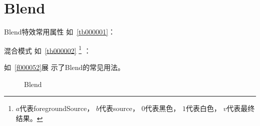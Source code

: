 ﻿




\FloatBarrier
\section{
Blend
}\label{c000015s000002}


Blend特效常用属性
如\tablename\ \ref{tb000001}：



混合模式
如\tablename\ \ref{tb000002}
    \footnote{$a$代表foregroundSource，
$b$代表source，
$0$代表黑色，
$1$代表白色，
$v$代表最终结果。}
：



如\filesourcenumbernameone\ \ref{f000052}展
示了Blend的常见用法。

\begin{figure}[htb] %
\marginnote{\setlength\fboxsep{2pt}\fbox{\footnotesize{\kaishu\figurename\,}\footnotesize{\ref{p000018}}}}\centering %
\setlength\fboxsep{-1pt} %
\caption{Blend} %
\label{p000018} %
\end{figure}


